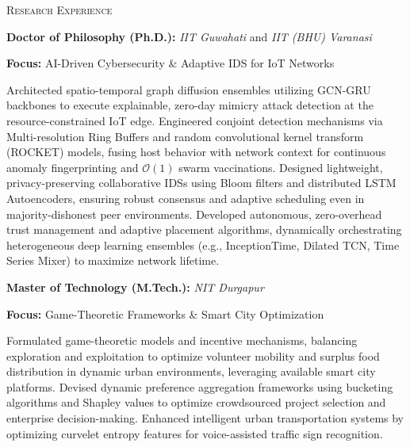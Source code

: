 \begin{rubric}{\textsc{Research Experience}}

\entry*[$2021~ -$ Present]%
\textbf{Doctor of Philosophy (Ph.D.):} \emph{IIT Guwahati} and \emph{IIT (BHU) Varanasi}
\par \textbf{Focus:} AI-Driven Cybersecurity \& Adaptive IDS for IoT Networks

\entry*[] Architected spatio-temporal graph diffusion ensembles utilizing GCN-GRU backbones to execute explainable, zero-day mimicry attack detection at the resource-constrained IoT edge.
\entry*[] Engineered conjoint detection mechanisms via Multi-resolution Ring Buffers and random convolutional kernel transform (ROCKET) models, fusing host behavior with network context for continuous anomaly fingerprinting and $\mathcal{O}(1)$ swarm vaccinations.
\entry*[] Designed lightweight, privacy-preserving collaborative IDSs using Bloom filters and distributed LSTM Autoencoders, ensuring robust consensus and adaptive scheduling even in majority-dishonest peer environments.
\entry*[] Developed autonomous, zero-overhead trust management and adaptive placement algorithms, dynamically orchestrating heterogeneous deep learning ensembles (e.g., InceptionTime, Dilated TCN, Time Series Mixer) to maximize network lifetime.

\entry*[$2019 - 2021$]%
\textbf{Master of Technology (M.Tech.):} \emph{NIT Durgapur}
\par \textbf{Focus:} Game-Theoretic Frameworks \& Smart City Optimization

\entry*[] Formulated game-theoretic models and incentive mechanisms, balancing exploration and exploitation to optimize volunteer mobility and surplus food distribution in dynamic urban environments, leveraging available smart city platforms.
\entry*[] Devised dynamic preference aggregation frameworks using bucketing algorithms and Shapley values to optimize crowdsourced project selection and enterprise decision-making.
\entry*[] Enhanced intelligent urban transportation systems by optimizing curvelet entropy features for voice-assisted traffic sign recognition.

\end{rubric}